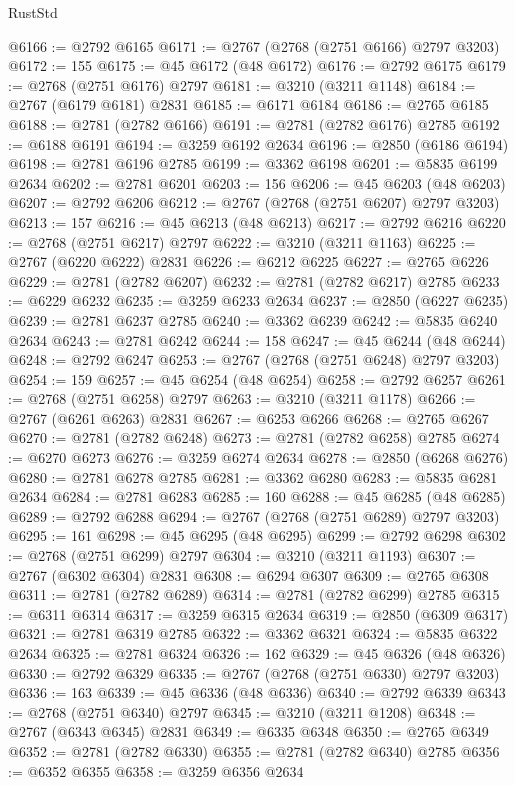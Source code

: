 \begin{lexlean}{RustStd}
\begin{coremodule}
@6166 := @2792 @6165
@6171 := @2767 (@2768 (@2751 @6166) @2797 @3203)
@6172 := 155
@6175 := @45 @6172 (@48 @6172)
@6176 := @2792 @6175
@6179 := @2768 (@2751 @6176) @2797
@6181 := @3210 (@3211 @1148)
@6184 := @2767 (@6179 @6181) @2831
@6185 := @6171 @6184
@6186 := @2765 @6185
@6188 := @2781 (@2782 @6166)
@6191 := @2781 (@2782 @6176) @2785
@6192 := @6188 @6191
@6194 := @3259 @6192 @2634
@6196 := @2850 (@6186 @6194)
@6198 := @2781 @6196 @2785
@6199 := @3362 @6198
@6201 := @5835 @6199 @2634
@6202 := @2781 @6201
@6203 := 156
@6206 := @45 @6203 (@48 @6203)
@6207 := @2792 @6206
@6212 := @2767 (@2768 (@2751 @6207) @2797 @3203)
@6213 := 157
@6216 := @45 @6213 (@48 @6213)
@6217 := @2792 @6216
@6220 := @2768 (@2751 @6217) @2797
@6222 := @3210 (@3211 @1163)
@6225 := @2767 (@6220 @6222) @2831
@6226 := @6212 @6225
@6227 := @2765 @6226
@6229 := @2781 (@2782 @6207)
@6232 := @2781 (@2782 @6217) @2785
@6233 := @6229 @6232
@6235 := @3259 @6233 @2634
@6237 := @2850 (@6227 @6235)
@6239 := @2781 @6237 @2785
@6240 := @3362 @6239
@6242 := @5835 @6240 @2634
@6243 := @2781 @6242
@6244 := 158
@6247 := @45 @6244 (@48 @6244)
@6248 := @2792 @6247
@6253 := @2767 (@2768 (@2751 @6248) @2797 @3203)
@6254 := 159
@6257 := @45 @6254 (@48 @6254)
@6258 := @2792 @6257
@6261 := @2768 (@2751 @6258) @2797
@6263 := @3210 (@3211 @1178)
@6266 := @2767 (@6261 @6263) @2831
@6267 := @6253 @6266
@6268 := @2765 @6267
@6270 := @2781 (@2782 @6248)
@6273 := @2781 (@2782 @6258) @2785
@6274 := @6270 @6273
@6276 := @3259 @6274 @2634
@6278 := @2850 (@6268 @6276)
@6280 := @2781 @6278 @2785
@6281 := @3362 @6280
@6283 := @5835 @6281 @2634
@6284 := @2781 @6283
@6285 := 160
@6288 := @45 @6285 (@48 @6285)
@6289 := @2792 @6288
@6294 := @2767 (@2768 (@2751 @6289) @2797 @3203)
@6295 := 161
@6298 := @45 @6295 (@48 @6295)
@6299 := @2792 @6298
@6302 := @2768 (@2751 @6299) @2797
@6304 := @3210 (@3211 @1193)
@6307 := @2767 (@6302 @6304) @2831
@6308 := @6294 @6307
@6309 := @2765 @6308
@6311 := @2781 (@2782 @6289)
@6314 := @2781 (@2782 @6299) @2785
@6315 := @6311 @6314
@6317 := @3259 @6315 @2634
@6319 := @2850 (@6309 @6317)
@6321 := @2781 @6319 @2785
@6322 := @3362 @6321
@6324 := @5835 @6322 @2634
@6325 := @2781 @6324
@6326 := 162
@6329 := @45 @6326 (@48 @6326)
@6330 := @2792 @6329
@6335 := @2767 (@2768 (@2751 @6330) @2797 @3203)
@6336 := 163
@6339 := @45 @6336 (@48 @6336)
@6340 := @2792 @6339
@6343 := @2768 (@2751 @6340) @2797
@6345 := @3210 (@3211 @1208)
@6348 := @2767 (@6343 @6345) @2831
@6349 := @6335 @6348
@6350 := @2765 @6349
@6352 := @2781 (@2782 @6330)
@6355 := @2781 (@2782 @6340) @2785
@6356 := @6352 @6355
@6358 := @3259 @6356 @2634

\end{coremodule}
\end{lexlean}
